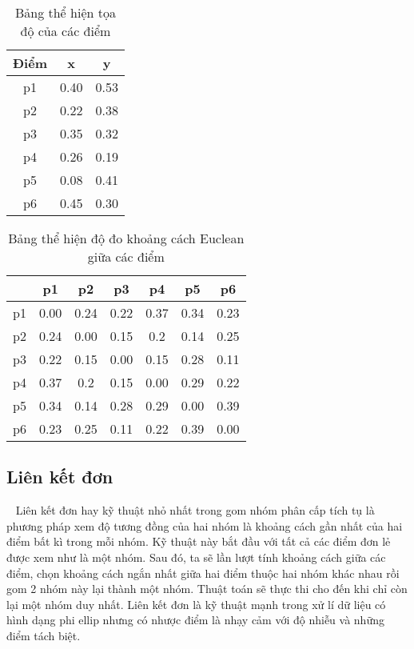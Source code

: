\begin{table}[h!]
\centering
\caption{Bảng thể hiện tọa độ của các điểm}
\label{tab:2_1}
\begin{tabular}{|c|c|c|}
\hline
Điểm & x & y \\ \hline
p1    & 0.40         & 0.53         \\ \hline
p2    & 0.22         & 0.38         \\ \hline
p3    & 0.35         & 0.32         \\ \hline
p4    & 0.26         & 0.19         \\ \hline
p5    & 0.08         & 0.41         \\ \hline
p6    & 0.45         & 0.30         \\ \hline
\end{tabular}
\end{table}

\begin{table}[h!]
\centering
\caption{Bảng thể hiện độ đo khoảng cách Euclean giữa các điểm}
\label{tab:2_2}
\begin{tabular}{|c|c|c|c|c|c|c|}
\hline
   & p1   & p2   & p3   & p4   & p5   & p6   \\ \hline
p1 & 0.00 & 0.24 & 0.22 & 0.37 & 0.34 & 0.23 \\ \hline
p2 & 0.24 & 0.00 & 0.15 & 0.2  & 0.14 & 0.25 \\ \hline
p3 & 0.22 & 0.15 & 0.00 & 0.15 & 0.28 & 0.11 \\ \hline
p4 & 0.37 & 0.2  & 0.15 & 0.00 & 0.29 & 0.22 \\ \hline
p5 & 0.34 & 0.14 & 0.28 & 0.29 & 0.00 & 0.39 \\ \hline
p6 & 0.23 & 0.25 & 0.11 & 0.22 & 0.39 & 0.00 \\ \hline
\end{tabular}%
\end{table}

\subsection{Liên kết đơn}	
\label{sec:lkd}	
~\cite{Vipin-Kumar, HAC, AHC, hierarchical-clustering, single-complete, explain-HAC} Liên kết đơn hay kỹ thuật nhỏ nhất trong gom nhóm phân cấp tích tụ là phương pháp xem độ tương đồng của hai nhóm là khoảng cách gần nhất của hai điểm bất kì trong mỗi nhóm. 
Kỹ thuật này bắt đầu với tất cả các điểm đơn lẻ được xem như là một nhóm.
Sau đó, ta sẽ lần lượt tính khoảng cách giữa các điểm, chọn khoảng cách ngắn nhất giữa hai điểm thuộc hai nhóm khác nhau rồi gom 2 nhóm này lại thành một nhóm.
Thuật toán sẽ thực thi cho đến khi chỉ còn lại một nhóm duy nhất.
Liên kết đơn là kỹ thuật mạnh trong xử lí dữ liệu có hình dạng phi ellip nhưng có nhược điểm là nhạy cảm với độ nhiễu và những điểm tách biệt.

